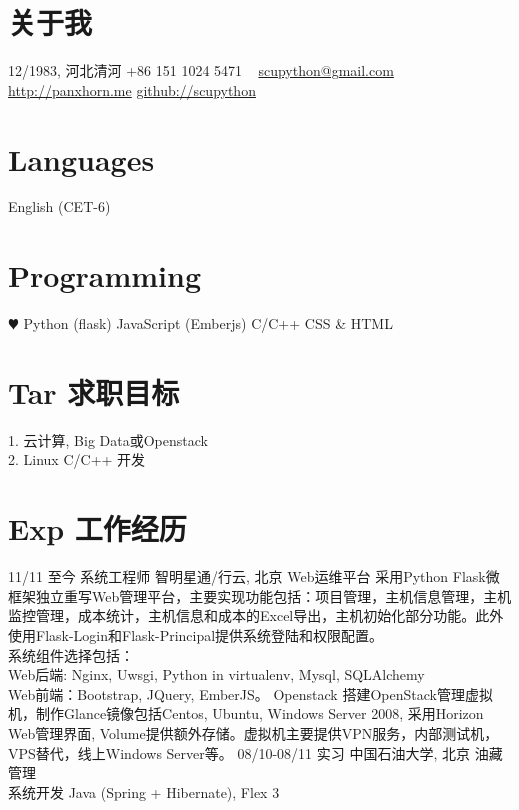 \documentclass[]{friggeri-cv}
\begin{document}


\begin{aside}
  \section{关于我}
    12/1983, 河北清河
    +86 151 1024 5471
    ~
    \href{mailto:scupython@gmail.com}{scupython@gmail.com}
    \href{http://panxhorn.me}{http://panxhorn.me}
    \href{https://github.com/scupython/}{github://scupython}
  \section{Languages}
    English (CET-6)
  \section{Programming}
    {\color{red} $\varheartsuit$} Python (flask)
    JavaScript (Emberjs)
    C/C++ 
    CSS \& HTML
\end{aside}
\section{Tar 求职目标}
1. 云计算, Big Data或Openstack\\
2. Linux C/C++ 开发

\section{Exp 工作经历}
\begin{entrylist}
  \entry
    {\small 11/11 至今}
    {系统工程师}
    {智明星通/行云, 北京}
    {Web运维平台}
    {采用Python Flask微框架独立重写Web管理平台，主要实现功能包括：项目管理，主机信息管理，主机监控管理，成本统计，主机信息和成本的Excel导出，主机初始化部分功能。此外使用Flask-Login和Flask-Principal提供系统登陆和权限配置。\\
      系统组件选择包括：\\
      Web后端: Nginx, Uwsgi, Python in virtualenv, Mysql, SQLAlchemy\\
      Web前端：Bootstrap, JQuery, EmberJS。}
    \entry{}{}{}
     {Openstack}
      {搭建OpenStack管理虚拟机，制作Glance镜像包括Centos, Ubuntu, Windows Server 2008, 采用Horizon Web管理界面, Volume提供额外存储。虚拟机主要提供VPN服务，内部测试机，VPS替代，线上Windows Server等。}      
  \entry
    {\small 08/10-08/11}
    {实习}
    {中国石油大学, 北京}
    {油藏管理\\系统开发}
    {Java (Spring + Hibernate), Flex 3}
\end{entrylist}
\end{document}
